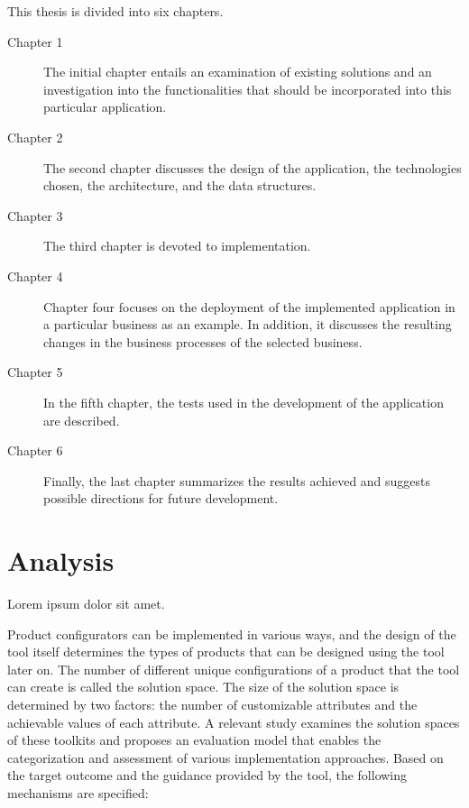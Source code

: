 This thesis is divided into six chapters.

\begin{description}
\item[Chapter 1] The initial chapter entails an examination of existing solutions and an investigation into the functionalities that should be incorporated into this particular application.

\item[Chapter 2] The second chapter discusses the design of the application, the technologies chosen, the architecture, and the data structures.

\item[Chapter 3] The third chapter is devoted to implementation.

\item[Chapter 4] Chapter four focuses on the deployment of the implemented application in a particular business as an example. In addition, it discusses the resulting changes in the business processes of the selected business.

\item[Chapter 5] In the fifth chapter, the tests used in the development of the application are described.

\item[Chapter 6] Finally, the last chapter summarizes the results achieved and suggests possible directions for future development.
\end{description}


\chapter{Analysis}

\begin{chapterabstract}
	Lorem ipsum dolor sit amet. 
\end{chapterabstract}

Product configurators can be implemented in various ways, and the design of the tool itself determines the types of products that can be designed using the tool later on. The number of different unique configurations of a product that the tool can create is called the solution space. The size of the solution space is determined by two factors: the number of customizable attributes and the achievable values of each attribute. \cite{Huiwen2018} A relevant study examines the solution spaces of these toolkits and proposes an evaluation model that enables the categorization and assessment of various implementation approaches. Based on the target outcome and the guidance provided by the tool, the following mechanisms are specified: \cite{Hermans2012}

